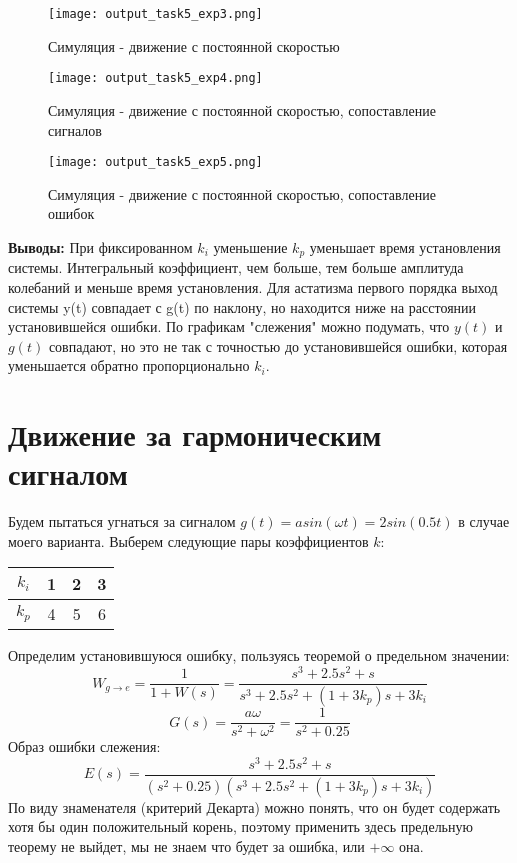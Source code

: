 \begin{figure}[ht]
  \centering
  \texttt{[image: output\_task5\_exp3.png]}
\caption{Симуляция - движение с постоянной скоростью}
\end{figure}

\newpage
\begin{figure}[ht]
  \centering
  \texttt{[image: output\_task5\_exp4.png]}
\caption{Симуляция - движение с постоянной скоростью, сопоставление сигналов}
\end{figure}

\begin{figure}[ht]
  \centering
  \texttt{[image: output\_task5\_exp5.png]}
\caption{Симуляция - движение с постоянной скоростью, сопоставление ошибок}
\end{figure}

\newpage
\textbf{Выводы:} При фиксированном $k_i$ уменьшение $k_p$ уменьшает время установления системы. Интегральный коэффициент, чем больше, тем больше амплитуда колебаний и меньше время установления. 
Для астатизма первого порядка выход системы y(t) совпадает с g(t) по наклону, но находится ниже на расстоянии установившейся ошибки. 
По графикам "слежения" можно подумать, что $y(t)$ и $g(t)$ совпадают, но это не так с точностью до установившейся ошибки, которая уменьшается обратно пропорционально $k_i$. 

\newpage
\section{Движение за гармоническим сигналом}

Будем пытаться угнаться за сигналом $g(t) = asin(\omega t) = 2sin(0.5t)$ в случае моего варианта.
Выберем следующие пары коэффициентов $k$:

\begin{center}
  \begin{tabular}{ |c|c|c|c|} 
    \hline
    $k_i$  & 1   & 2  & 3 \\
    \hline
    $k_p$  & 4   & 5  & 6  \\
   \hline
   \end{tabular}     
\end{center}



Определим установившуюся ошибку, пользуясь теоремой о предельном значении:
$$
W_{g\to e} = \frac{1}{1+W(s)} = \frac{s^3 + 2.5s^2 + s}{s^3 + 2.5s^2 + (1+3k_p)s + 3k_i}
$$
$$
G(s) = \frac{a\omega}{s^2 + \omega^2} = \frac{1}{s^2 + 0.25}
$$
Образ ошибки слежения:
$$
E(s) = \frac{s^3 + 2.5s^2 + s}{(s^2 + 0.25)(s^3 + 2.5s^2 + (1+3k_p)s + 3k_i)}
$$
По виду знаменателя (критерий Декарта) можно понять, что он будет содержать хотя бы один положительный корень, 
поэтому применить здесь предельную теорему не выйдет, мы не знаем что будет за ошибка, или $+\infty$ она.


